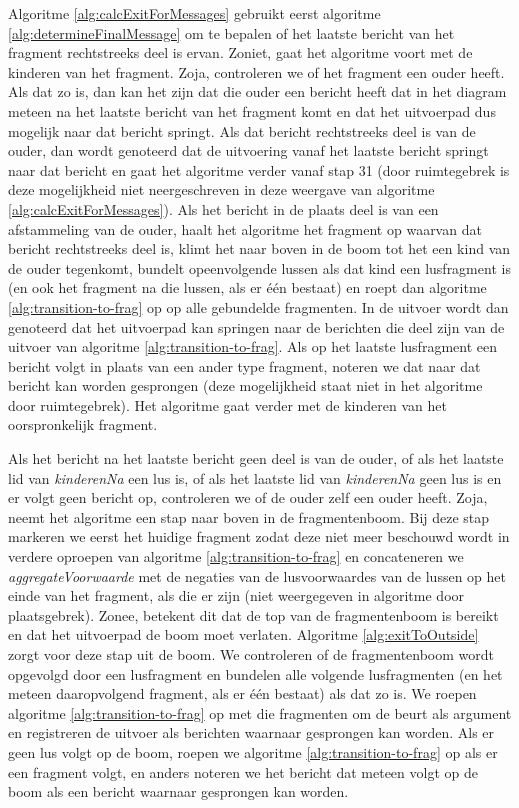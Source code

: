 Algoritme \ref{alg:calcExitForMessages} gebruikt eerst algoritme \ref{alg:determineFinalMessage} om te bepalen of het laatste bericht van het fragment rechtstreeks deel is ervan. Zoniet, gaat het algoritme voort met de kinderen van het fragment. Zoja, controleren we of het fragment een ouder heeft. Als dat zo is, dan kan het zijn dat die ouder een bericht heeft dat in het diagram meteen na het laatste bericht van het fragment komt en dat het uitvoerpad dus mogelijk naar dat bericht springt. Als dat bericht rechtstreeks deel is van de ouder, dan wordt genoteerd dat de uitvoering vanaf het laatste bericht springt naar dat bericht en gaat het algoritme verder vanaf stap 31 (door ruimtegebrek is deze mogelijkheid niet neergeschreven in deze weergave van algoritme \ref{alg:calcExitForMessages}). Als het bericht in de plaats deel is van een afstammeling van de ouder, haalt het algoritme het fragment op waarvan dat bericht rechtstreeks deel is, klimt het naar boven in de boom tot het een kind van de ouder tegenkomt, bundelt opeenvolgende lussen als dat kind een lusfragment is (en ook het fragment na die lussen, als er \'e\'en bestaat) en roept dan algoritme \ref{alg:transition-to-frag} op op alle gebundelde fragmenten. In de uitvoer wordt dan genoteerd dat het uitvoerpad kan springen naar de berichten die deel zijn van de uitvoer van algoritme \ref{alg:transition-to-frag}. Als op het laatste lusfragment een bericht volgt in plaats van een ander type fragment, noteren we dat naar dat bericht kan worden gesprongen (deze mogelijkheid staat niet in het algoritme door ruimtegebrek). Het algoritme gaat verder met de kinderen van het oorspronkelijk fragment.

Als het bericht na het laatste bericht geen deel is van de ouder, of als het laatste lid van \textit{kinderenNa} een lus is, of als het laatste lid van \textit{kinderenNa} geen lus is en er volgt geen bericht op, controleren we of de ouder zelf een ouder heeft. Zoja, neemt het algoritme een stap naar boven in de fragmentenboom. Bij deze stap markeren we eerst het huidige fragment zodat deze niet meer beschouwd wordt in verdere oproepen van algoritme \ref{alg:transition-to-frag} en concateneren we \textit{aggregateVoorwaarde} met de negaties van de lusvoorwaardes van de lussen op het einde van het fragment, als die er zijn (niet weergegeven in algoritme door plaatsgebrek). Zonee, betekent dit dat de top van de fragmentenboom is bereikt en dat het uitvoerpad de boom moet verlaten. Algoritme \ref{alg:exitToOutside} zorgt voor deze stap uit de boom. We controleren of de fragmentenboom wordt opgevolgd door een lusfragment en bundelen alle volgende lusfragmenten (en het meteen daaropvolgend fragment, als er \'e\'en bestaat) als dat zo is. We roepen algoritme \ref{alg:transition-to-frag} op met die fragmenten om de beurt als argument en registreren de uitvoer als berichten waarnaar gesprongen kan worden. Als er geen lus volgt op de boom, roepen we algoritme \ref{alg:transition-to-frag} op als er een fragment volgt, en anders noteren we het bericht dat meteen volgt op de boom als een bericht waarnaar gesprongen kan worden.

